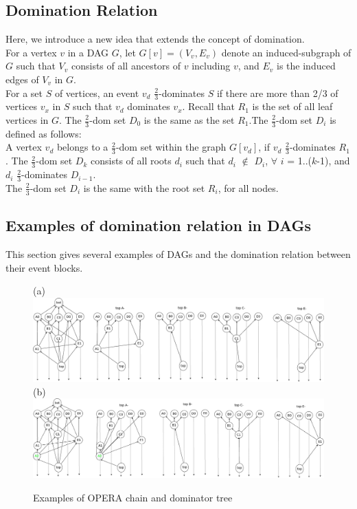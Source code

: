 \documentclass{article}
\begin{document}
\subsection{Domination Relation}

Here, we introduce a new idea that extends the concept of domination.\\

For a vertex $v$ in a DAG $G$, let $G[v] = (V_v,E_v)$ denote an induced-subgraph of $G$ such that $V_v$ consists of all ancestors of $v$ including $v$, and $E_v$ is the induced edges of $V_v$ in $G$.\\

For a set $S$ of vertices, an event $v_d$  $\frac{2}{3}$-dominates $S$ if there are more than 2/3 of vertices $v_x$ in $S$ such that $v_d$ dominates $v_x$. 	
Recall that $R_1$ is the set of all leaf vertices in $G$. The $\frac{2}{3}$-dom set $D_0$ is the same as the set $R_1$.The $\frac{2}{3}$-dom set $D_i$ is defined as follows:	\\

A vertex $v_d$ belongs to a $\frac{2}{3}$-dom set within the graph $G[v_d]$, if $v_d$ $\frac{2}{3}$-dominates $R_1$.
	The $\frac{2}{3}$-dom set $D_k$ consists of all roots $d_i$ such that  $d_i$ $\not \in $ $D_i$, $\forall$ $i$ = 1..($k$-1), and $d_i$ $\frac{2}{3}$-dominates $D_{i-1}$.\\
	
The $\frac{2}{3}$-dom set $D_i$ is the same with the root set $R_i$, for all nodes.\\

\subsection{Examples of domination relation in DAGs}

This section gives several examples of DAGs and the domination relation between their event blocks.
\begin{figure}[h]
	\centering
	(a)\includegraphics[width=0.95\linewidth]{domtrees}\\
	(b)\includegraphics[width=0.95\linewidth]{domtrees_add1event}
	\caption{Examples of OPERA chain and dominator tree}
	\label{fig:domtrees1}
\end{figure}
\end{document}
